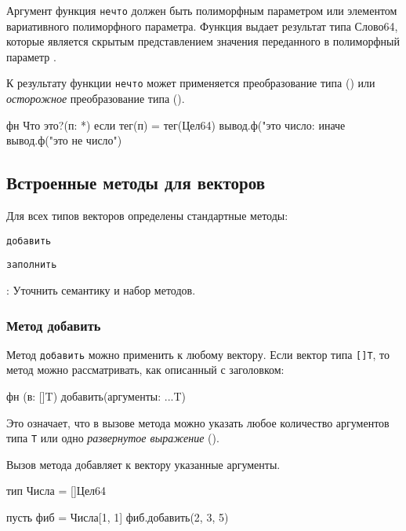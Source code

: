 \bigskip
Аргумент функция \verb+нечто+ должен быть полиморфным параметром или элементом вариативного полиморфного параметра. 
Функция выдает результат типа Слово64, которые является скрытым представлением значения переданного в полиморфный параметр .

К результату функции \verb+нечто+ может применяется преобразование типа () или \emph{осторожное} преобразование типа ().

\begin{Trivil}
фн Что это?(п: *) {
    если тег(п) = тег(Цел64) { 
        вывод.ф("это число: %
    }
    иначе { 
        вывод.ф("это не число") 
    }
}
\end{Trivil}

\hypertarget{stdvector}{%
\subsection{Встроенные методы для векторов}\label{stdfuncs:stdvector}}

Для всех типов векторов определены стандартные методы:
\begin{d_itemize}
\item
    \verb+добавить+
\item
    \verb+заполнить+
\end{d_itemize}

\bigskip
\TBD: Уточнить семантику и набор методов.

\hypertarget{vector-append}{%
\subsubsection{Метод добавить}\label{stdfuncs:vector-append}}

Метод \verb+добавить+ можно применить к любому вектору. Если вектор типа \verb+[]T+, то метод можно рассматривать, как описанный с заголовком:
\begin{Trivil}
фн (в: []T) добавить(аргументы: ...T) 
\end{Trivil}

Это означает, что в вызове метода можно указать любое количество аргументов типа \verb+T+ или одно \emph{развернутое выражение} ().

Вызов метода добавляет к вектору указанные аргументы.

\begin{Trivil}
тип Числа = []Цел64

пусть фиб = Числа[1, 1]
фиб.добавить(2, 3, 5)
\end{Trivil}


